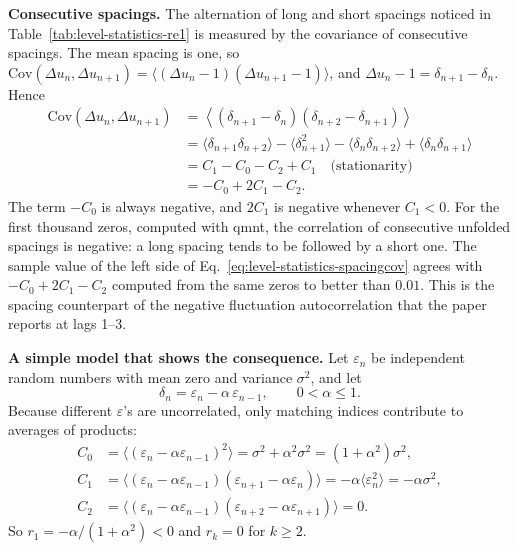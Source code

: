\textbf{Consecutive spacings.} The alternation of long and short spacings noticed in Table~\ref{tab:level-statistics-re1} is measured by the covariance of consecutive spacings. The mean spacing is one, so $\mathrm{Cov}(\Delta u_n,\Delta u_{n+1})=\langle(\Delta u_n-1)(\Delta u_{n+1}-1)\rangle$, and $\Delta u_n-1=\delta_{n+1}-\delta_n$. Hence
\begin{align}
\mathrm{Cov}(\Delta u_n,\Delta u_{n+1})&=\left\langle(\delta_{n+1}-\delta_n)(\delta_{n+2}-\delta_{n+1})\right\rangle\nonumber\\
&=\langle\delta_{n+1}\delta_{n+2}\rangle-\langle\delta_{n+1}^2\rangle-\langle\delta_n\delta_{n+2}\rangle+\langle\delta_n\delta_{n+1}\rangle\nonumber\\
&=C_1-C_0-C_2+C_1\quad\text{(stationarity)}\nonumber\\
&=-C_0+2C_1-C_2 .
\label{eq:level-statistics-spacingcov}
\end{align}
The term $-C_0$ is always negative, and $2C_1$ is negative whenever $C_1<0$. For the first thousand zeros, computed with qmnt, the correlation of consecutive unfolded spacings is negative: a long spacing tends to be followed by a short one. The sample value of the left side of Eq.~\eqref{eq:level-statistics-spacingcov} agrees with $-C_0+2C_1-C_2$ computed from the same zeros to better than $0.01$. This is the spacing counterpart of the negative fluctuation autocorrelation that the paper reports at lags 1--3.

\textbf{A simple model that shows the consequence.} Let $\varepsilon_n$ be independent random numbers with mean zero and variance $\sigma^2$, and let
\begin{equation}
\delta_n=\varepsilon_n-\alpha\,\varepsilon_{n-1},\qquad 0<\alpha\le1 .
\label{eq:level-statistics-ma1}
\end{equation}
Because different $\varepsilon$'s are uncorrelated, only matching indices contribute to averages of products:
\begin{align}
C_0&=\langle(\varepsilon_n-\alpha\varepsilon_{n-1})^2\rangle=\sigma^2+\alpha^2\sigma^2=(1+\alpha^2)\sigma^2,\\
C_1&=\langle(\varepsilon_n-\alpha\varepsilon_{n-1})(\varepsilon_{n+1}-\alpha\varepsilon_n)\rangle=-\alpha\langle\varepsilon_n^2\rangle=-\alpha\sigma^2,\\
C_2&=\langle(\varepsilon_n-\alpha\varepsilon_{n-1})(\varepsilon_{n+2}-\alpha\varepsilon_{n+1})\rangle=0 .
\end{align}
So $r_1=-\alpha/(1+\alpha^2)<0$ and $r_k=0$ for $k\ge2$.

